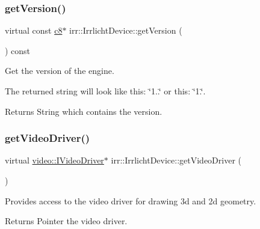 \subsubsection{\texorpdfstring{get\+Version()}{getVersion()}\hspace{0.1cm}{\footnotesize\ttfamily [2/2]}}
{\footnotesize\ttfamily virtual const \hyperlink{namespaceirr_a9395eaea339bcb546b319e9c96bf7410}{c8}$\ast$ irr\+::\+Irrlicht\+Device\+::get\+Version (\begin{DoxyParamCaption}{ }\end{DoxyParamCaption}) const\hspace{0.3cm}{\ttfamily [pure virtual]}}



Get the version of the engine. 

The returned string will look like this\+: \char`\"{}1..\char`\"{} or this\+: \char`\"{}1.\char`\"{}. \begin{DoxyReturn}{Returns}
String which contains the version. 
\end{DoxyReturn}
\mbox{\label{classirr_1_1IrrlichtDevice_ada90707ba5c645d47e000e4e0f87c4c4}} 
\subsubsection{\texorpdfstring{get\+Video\+Driver()}{getVideoDriver()}\hspace{0.1cm}{\footnotesize\ttfamily [1/2]}}
{\footnotesize\ttfamily virtual \hyperlink{classirr_1_1video_1_1IVideoDriver}{video\+::\+I\+Video\+Driver}$\ast$ irr\+::\+Irrlicht\+Device\+::get\+Video\+Driver (\begin{DoxyParamCaption}{ }\end{DoxyParamCaption})\hspace{0.3cm}{\ttfamily [pure virtual]}}



Provides access to the video driver for drawing 3d and 2d geometry. 

\begin{DoxyReturn}{Returns}
Pointer the video driver. 
\end{DoxyReturn}
\mbox{\label{classirr_1_1IrrlichtDevice_ada90707ba5c645d47e000e4e0f87c4c4}} 
